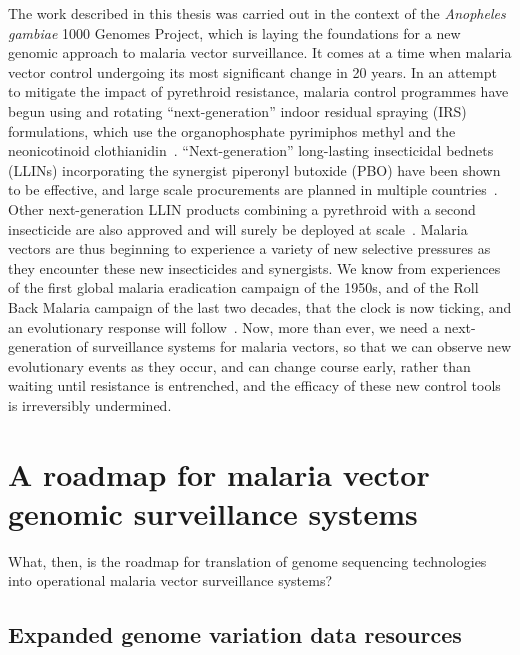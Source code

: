 \documentclass[a4paper,11pt,abstracton,hidelinks]{scrartcl}
\begin{document}
The work described in this thesis was carried out in the context of the \textit{Anopheles gambiae} 1000 Genomes Project, which is laying the foundations for a new genomic approach to malaria vector surveillance.
%
It comes at a time when malaria vector control undergoing its most significant change in 20 years.
%
In an attempt to mitigate the impact of pyrethroid resistance, malaria control programmes have begun using and rotating ``next-generation'' indoor residual spraying (IRS) formulations, which use the organophosphate pyrimiphos methyl and the neonicotinoid clothianidin~\parencite{Oxborough2014,Oxborough2019,WHO2019WMR}.
%
``Next-generation'' long-lasting insecticidal bednets (LLINs) incorporating the synergist piperonyl butoxide (PBO) have been shown to be effective, and large scale procurements are planned in multiple countries~\parencite{Protopopoff2018,Staedke2020}.
%
Other next-generation LLIN products combining a pyrethroid with a second insecticide are also approved and will surely be deployed at scale~\parencite{Bayili2017,Tiono2018}.
%
Malaria vectors are thus beginning to experience a variety of new selective pressures as they encounter these new insecticides and synergists.
%
We know from experiences of the first global malaria eradication campaign of the 1950s, and of the Roll Back Malaria campaign of the last two decades, that the clock is now ticking, and an evolutionary response will follow~\parencite{Elliott1956,Hancock2020}.
%
Now, more than ever, we need a next-generation of surveillance systems for malaria vectors, so that we can observe new evolutionary events as they occur, and can change course early, rather than waiting until resistance is entrenched, and the efficacy of these new control tools is irreversibly undermined.


\section{A roadmap for malaria vector genomic surveillance systems}\label{sec:roadmap}


What, then, is the roadmap for translation of genome sequencing technologies into operational malaria vector surveillance systems?


\subsection{Expanded genome variation data resources}
\end{document}
